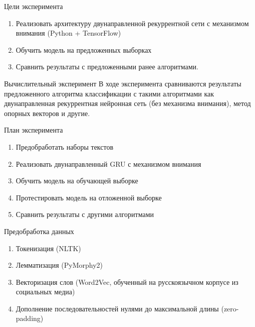 \documentclass{beamer}
\begin{document}
\begin{frame}{Цели эксперимента}
	\begin{enumerate}
		\item Реализовать архитектуру двунаправленной рекуррентной сети с механизмом внимания (Python + TensorFlow)
		\item Обучить модель на предложенных выборках
		\item Сравнить результаты с предложенными ранее алгоритмами.
	\end{enumerate}
\end{frame}
\begin{frame}{Вычислительный эксперимент}
В ходе эксперимента сравниваются результаты предложенного алгоритма классификации с такими алгоритмами как двунаправленная рекуррентная нейронная сеть (без механизма внимания), метод опорных векторов и другие. \\
\begin{block}{План эксперимента}
	\begin{enumerate}
		\item Предобработать наборы текстов
		\item Реализовать двунаправленный GRU с механизмом внимания
		\item Обучить модель на обучающей выборке
		\item Протестировать модель на отложенной выборке
		\item Сравнить результаты с другими алгоритмами
	\end{enumerate}
\end{block}
\end{frame}
\begin{frame}{Предобработка данных}

\begin{enumerate}
	\item Токенизация (NLTK)
	\item Лемматизация (PyMorphy2)
	\item Векторизация слов (Word2Vec, обученный на русскоязычном корпусе из социальных медиа)
	\item Дополнение последовательностей нулями до максимальной длины (zero-padding)
	
\end{enumerate}
\end{frame}
\end{document}
